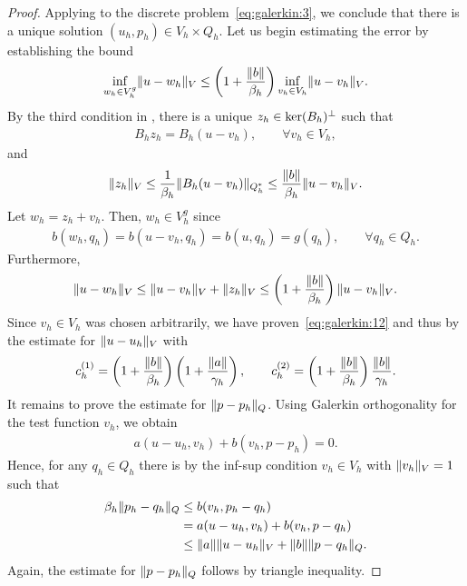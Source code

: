 \begin{proof}
  Applying  to the discrete
  problem~\eqref{eq:galerkin:3}, we conclude that there is a unique
  solution $(u_h,p_h)\in V_h\times Q_h$. Let us begin estimating the
  error by establishing the bound
  \begin{gather}
    \label{eq:galerkin:12}
    \inf_{w_h\in V_h^g} \lVert u-w_h\rVert_V
    \le \left(1+\frac{\lVert b\rVert}{\beta_h}\right)
    \inf_{v_h\in V_h} \lVert u-v_h\rVert_V.
  \end{gather}
  By the third condition in
  , there is a unique
  $z_h\in \operatorname{ker}(B_h)^\perp$ such that
  \begin{gather*}
    B_h z_h = B_h(u-v_h),\qquad \forall v_h\in V_h,
  \end{gather*}
  and
  \begin{gather*}
    \lVert z_h\rVert_V \le \frac1{\beta_h}\lVert B_h(u-v_h)\rVert_{Q_h^*}
    \le\frac{\lVert b\rVert}{\beta_h} \lVert u-v_h\rVert_V.
  \end{gather*}
  Let $w_h = z_h+v_h$. Then, $w_h\in V_h^g$ since
  \begin{gather*}
    b(w_h, q_h) = b(u-v_h, q_h) = b(u, q_h) = g(q_h),
    \qquad\forall q_h\in Q_h.
  \end{gather*}
  Furthermore,
  \begin{gather*}
    \lVert u-w_h\rVert_V \le \lVert u-v_h\rVert_V + \lVert z_h\rVert_V
    \le \left(1+\frac{\lVert b\rVert}{\beta_h}\right)
    \lVert u-v_h\rVert_V.
  \end{gather*}
  Since $v_h \in V_h$ was chosen arbitrarily, we have
  proven~\eqref{eq:galerkin:12} and thus by
   the estimate for
  $\lVert u-u_h\rVert_V$ with
  \begin{gather}
    c_h^{(1)} = \left(1+\frac{\lVert b\rVert}{\beta_h}\right)
    \left(1+\frac{\lVert a\rVert}{\gamma_h}\right),
    \qquad
    c_h^{(2)} = \left(1+\frac{\lVert b\rVert}{\beta_h}\right)
    \frac{\lVert b\rVert}{\gamma_h}.
  \end{gather}
  It remains to prove the estimate for $\lVert p-p_h\rVert_Q$. Using Galerkin
  orthogonality for the test function $v_h$, we obtain
  \begin{gather}
    \label{eq:galerkin:13}
    a(u-u_h, v_h) + b(v_h, p-p_h) = 0.
  \end{gather}
  Hence, for any $q_h\in Q_h$ there is by the inf-sup condition
  $v_h\in V_h$ with $\lVert v_h\rVert_V=1$ such that
  \begin{align*}
    \beta_h \lVert p_h-q_h\rVert_Q
    &\le b(v_h, p_h-q_h)\\
    & = a(u-u_h, v_h) + b(v_h, p-q_h)\\
    &\le \lVert a\rVert \lVert u-u_h\rVert_V + \lVert b\rVert \lVert p-q_h\rVert_Q.
  \end{align*}
  Again, the estimate for $\lVert p-p_h\rVert_Q$ follows by triangle
  inequality.
\end{proof}


